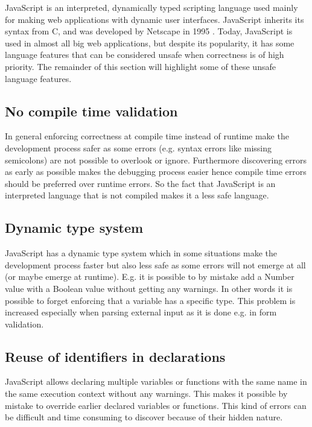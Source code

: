 	JavaScript is an interpreted, dynamically typed scripting language used mainly for making web applications with dynamic user interfaces. JavaScript inherits its syntax from C, and was developed by Netscape in 1995 \cite{bib:wiki_javascript}. Today, JavaScript is used in almost all big web applications, but despite its popularity, it has some language features that can be considered unsafe when correctness is of high priority. The remainder of this section will highlight some of these unsafe language features.

	\subsection{No compile time validation} %
	\label{sub:no_compile_time_validation}
		In general enforcing correctness at compile time instead of runtime make the development process safer as some errors (e.g. syntax errors like missing semicolons) are not possible to overlook or ignore. Furthermore discovering errors as early as possible makes the debugging process easier hence compile time errors should be preferred over runtime errors. So the fact that JavaScript is an interpreted language that is not compiled makes it a less safe language.

	\subsection{Dynamic type system} %
	\label{sub:dynamic_type_system}
		JavaScript has a dynamic type system which in some situations make the development process faster but also less safe as some errors will not emerge at all (or maybe emerge at runtime). E.g. it is possible to by mistake add a Number value with a Boolean value without getting any warnings. In other words it is possible to forget enforcing that a variable has a specific type. This problem is increased especially when parsing external input as it is done e.g. in form validation.

	\subsection{Reuse of identifiers in declarations} %
	\label{sec:reuse_of_identifiers_in_declarations}
		JavaScript allows declaring multiple variables or functions with the same name in the same execution context without any warnings. This makes it possible by mistake to override earlier declared variables or functions. This kind of errors can be difficult and time consuming to discover because of their hidden nature.


